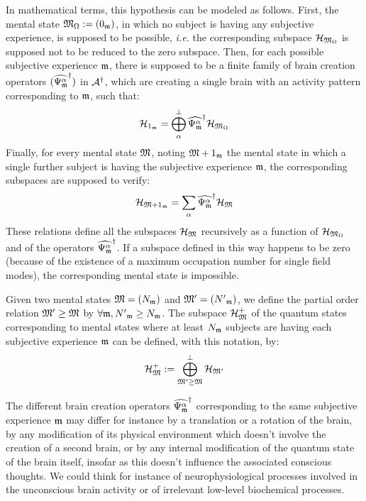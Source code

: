 In mathematical terms, this hypothesis can be modeled as follows.
First, the mental state $\mathfrak{M}_\Omega := ({0}_{\mathfrak{m}})$, in which no subject is having any subjective experience, is supposed to be possible, \textit{i.e.} the corresponding subspace $\mathcal H_{\mathfrak{M}_\Omega}$ is supposed not to be reduced to the zero subspace.
Then, for each possible subjective experience $\mathfrak{m}$, there is supposed to be a finite family of brain creation operators $(\widehat{\Psi_{\mathfrak{m}}^\alpha}^{\dagger})$ in $\mathcal A^{\dagger}$, which are creating a single brain with an activity pattern corresponding to $\mathfrak{m}$, such that:
\begin{equation*}
\mathcal H_{{1}_{\mathfrak{m}}} = \bigoplus_{\alpha}^\perp \widehat{\Psi_{\mathfrak{m}}^\alpha}^{\dagger} \mathcal H_{\mathfrak{M}_\Omega}
\end{equation*}
Finally, for every mental state $\mathfrak{M}$, noting $\mathfrak{M} + {1}_{\mathfrak{m}}$ the mental state in which a single further subject is having the subjective experience $\mathfrak{m}$, the corresponding subspaces are supposed to verify:
\begin{equation*}
\mathcal H_{\mathfrak{M} + {1}_{\mathfrak{m}}} = \sum_{\alpha} \widehat{\Psi_{\mathfrak{m}}^\alpha}^{\dagger} \mathcal H_{\mathfrak{M}}
\end{equation*}
These relations define all the subspaces $\mathcal H_{\mathfrak{M}}$ recursively as a function of $\mathcal H_{\mathfrak{M}_\Omega}$ and of the operators $\widehat{\Psi_{\mathfrak{m}}^\alpha}^{\dagger}$.
If a subspace defined in this way happens to be zero (because of the existence of a maximum occupation number for single field modes), the corresponding mental state is impossible.

Given two mental states $\mathfrak{M} = ({N}_{\mathfrak{m}})$ and $\mathfrak{M}' = ({N'}_{\mathfrak{m}})$, we define the partial order relation $\mathfrak{M}' \geq \mathfrak{M}$ by $\forall \mathfrak{m}, {N'}_{\mathfrak{m}} \geq {N}_{\mathfrak{m}}$.
The subspace $\mathcal H_{\mathfrak{M}}^+$ of the quantum states corresponding to mental states where at least ${N}_{\mathfrak{m}}$ subjects are having each subjective experience $\mathfrak{m}$ can be defined, with this notation, by:
\begin{equation*}
\mathcal H_{\mathfrak{M}}^+ := \bigoplus_{\mathfrak{M}' \geq \mathfrak{M}}^\perp \mathcal H_{\mathfrak{M}'}
\end{equation*}

 The different brain creation operators $\widehat{\Psi_{\mathfrak{m}}^\alpha}^{\dagger}$ corresponding to the same subjective experience $\mathfrak{m}$ may differ for instance by a translation or a rotation of the brain, by any modification of its physical environment which doesn't involve the creation of a second brain, or by any internal modification of the quantum state of the brain itself, insofar as this doesn't influence the associated conscious thoughts.
We could think for instance of neurophysiological processes involved in the unconscious brain activity or of irrelevant low-level biochemical processes.
